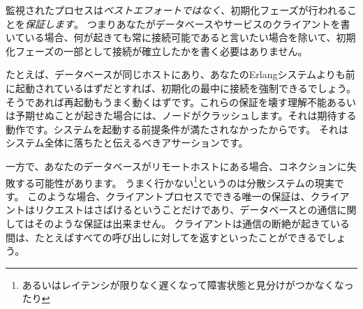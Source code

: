 監視されたプロセスは\emph{ベストエフォートではなく}、初期化フェーズが行われることを\emph{保証します}。
つまりあなたがデータベースやサービスのクライアントを書いている場合、何が起きても常に接続可能であると言いたい場合を除いて、初期化フェーズの一部として接続が確立したかを書く必要はありません。

たとえば、データベースが同じホストにあり、あなたのErlangシステムよりも前に起動されているはずだとすれば、初期化の最中に接続を強制できるでしょう。
そうであれば再起動もうまく動くはずです。これらの保証を壊す理解不能あるいは予期せぬことが起きた場合には、ノードがクラッシュします。それは期待する動作です。システムを起動する前提条件が満たされなかったからです。
それはシステム全体に落ちたと伝えるべきアサーションです。

一方で、あなたのデータベースがリモートホストにある場合、コネクションに失敗する可能性があります。
うまく行かない\footnote{あるいはレイテンシが限りなく遅くなって障害状態と見分けがつかなくなったり}というのは分散システムの現実です。
このような場合、クライアントプロセスでできる唯一の保証は、クライアントはリクエストはさばけるということだけであり、データベースとの通信に関してはそのような保証は出来ません。
クライアントは通信の断絶が起きている間は、たとえばすべての呼び出しに対してを返すといったことができるでしょう。


